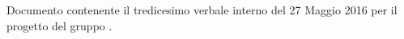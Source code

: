 Documento contenente il tredicesimo verbale interno del 27 Maggio 2016 per il progetto \progetto{} del gruppo \gruppo{}.
